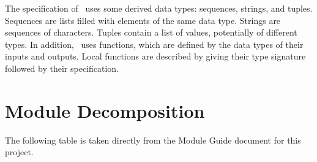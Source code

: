 \documentclass[12pt, titlepage]{article}
\begin{document}
\noindent
The specification of \progname \ uses some derived data types: sequences, strings, and
tuples. Sequences are lists filled with elements of the same data type. Strings
are sequences of characters. Tuples contain a list of values, potentially of
different types. In addition, \progname \ uses functions, which
are defined by the data types of their inputs and outputs. Local functions are
described by giving their type signature followed by their specification.

\section{Module Decomposition}

The following table is taken directly from the Module Guide document for this project.
\end{document}
